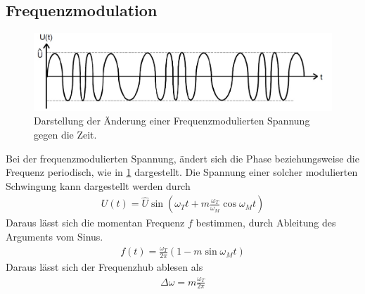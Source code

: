 \newpage
\subsection{Frequenzmodulation}
\begin{figure}[h!]
	\centering
	\includegraphics[width = \textwidth]{../Grafiken/Frequenzmodulation.pdf}
	\caption{Darstellung der Änderung einer Frequenzmodulierten Spannung gegen die Zeit.\cite{V59}\label{fig:Frequenzmodulation}}
\end{figure}
Bei der frequenzmodulierten Spannung, ändert sich die Phase beziehungsweise die Frequenz periodisch, wie in \cref{fig:Frequenzmodulation} dargestellt.
Die Spannung einer solcher modulierten Schwingung kann dargestellt werden durch
\begin{align}
	U(t)=\hat U \sin\left(\omega_Tt+m\frac{\omega_T}{\omega_M}\cos\omega_Mt\right)
\end{align}
Daraus lässt sich die momentan Frequenz $f$ bestimmen, durch Ableitung des Arguments vom Sinus.
\begin{align}
	f(t)=\frac{\omega_T}{2\pi}\left(1-m\sin\omega_Mt\right)
\end{align}
Daraus lässt sich der Frequenzhub ablesen als
\begin{align}
	\Delta \omega = m\frac{\omega_T}{2\pi}
\end{align}
